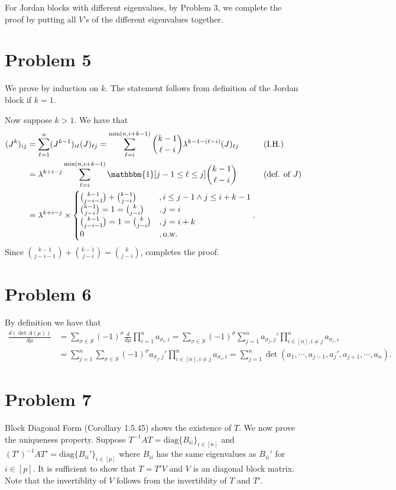 \documentclass[11pt]{article}
\theoremstyle{plain}
\theoremstyle{definition}
\theoremstyle{remark}
\newcommand{\ind}{\mathbbm{1}}
\newcommand{\diag}{\mathrm{diag}}
\begin{document}
For Jordan blocks with different eigenvalues, by Problem 3, we complete the proof by putting all $V$'s of the different eigenvalues together.
\section*{Problem 5}
We prove by induction on $k$. 
The statement follows from definition of the Jordan block if $k=1$.

Now suppose $k > 1$.
We have that 
\begin{align}
    (J^k)_{ij} &= \sum_{\ell=1}^n  (J^{k-1})_{i\ell} (J)_{\ell j}
    =  \sum_{\ell=i}^{\min(n,i+k-1)} \binom{k-1}{\ell - i}\lambda^{k-1-(\ell-i)} (J)_{\ell j} &&(\text{I.H.}) \nonumber
    \\&= \lambda^{k+i-j} \sum_{\ell=i}^{\min(n,i+k-1)} \ind[j-1\leq \ell \leq j]\binom{k-1}{\ell - i} &&(\text{def. of }J) \nonumber
    \\&= \lambda^{k+i-j}\times 
    \begin{cases}
        \binom{k-1}{j-i-1} + \binom{k-1}{j-i}&,i\leq j-1 \land j\leq i+k-1
        \\\binom{k-1}{j-i}=1=\binom{k}{j-i}&, j=i
        \\\binom{k-1}{j-i-1}=1=\binom{k}{j-i}&, j=i+k
        \\0 &, \text{o.w.}
    \end{cases} . \label{eq:P5_final}
\end{align}
Since $\binom{k-1}{j-i-1} + \binom{k-1}{j-i} = \binom{k}{j-i}$,  completes the proof.
\section*{Problem 6}
By definition we have that
\begin{align*}
    \frac{d(\det A(\mu))}{d\mu}
    &= \sum_{\sigma \in S} (-1)^\sigma \frac{d}{d\mu} \prod_{i=1}^n a_{\sigma_i,i}
    = \sum_{\sigma \in S} (-1)^\sigma \sum_{j=1}^n a_{\sigma_j,j}' \prod_{i\in[n],i\neq j}^n a_{\sigma_i,i}
    \\&= \sum_{j=1}^n \sum_{\sigma \in S} (-1)^\sigma a_{\sigma_j,j}' \prod_{i\in[n],i\neq j}^n a_{\sigma_i,i}
    = \sum_{j=1}^n \det (a_1,\cdots,a_{j-1},a_j',a_{j+1},\cdots,a_n).
\end{align*}
\section*{Problem 7}
Block Diagonal Form (Corollary 1.5.45) shows the existence of $T$.
We now prove the uniqueness property.
Suppose $T^{-1}AT = \diag\{B_{ii}\}_{i\in[n]}$ and $(T')^{-1}AT' = \diag\{B_{ii}'\}_{i\in[p]}$ where $B_{ii}$ has the same eigenvalues as $B_{ii}'$ for $i\in[p]$.
It is sufficient to show that $T = T'V$ and $V$ is an diagonal block matrix.
Note that the invertiblity of $V$ follows from the invertiblity of $T$ and $T'$. 
\end{document}
